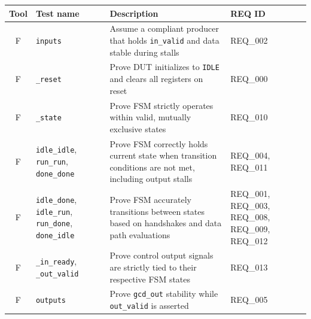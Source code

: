 \begin{table}[H]
    \centering
    \begin{tabularx}{\textwidth}{|c|p{3.9cm}|X|p{1.7cm}|}
        \toprule
        \textbf{Tool}   & \textbf{Test name}                                                                & \textbf{Description}                                                                                                      & \textbf{REQ ID}                                   \\ \midrule
        F               & \texttt{inputs}                                                                   & Assume a compliant producer that holds \texttt{in\_valid} and data stable during stalls                                   & REQ\_002                                          \\ \midrule
        F               & \texttt{\_reset}                                                                  & Prove DUT initializes to \texttt{IDLE} and clears all registers on reset                                                  & REQ\_000                                          \\ \midrule
        F               & \texttt{\_state}                                                                  & Prove FSM strictly operates within valid, mutually exclusive states                                                       & REQ\_010                                          \\ \midrule
        F               & \texttt{idle\_idle}, \texttt{run\_run}, \texttt{done\_done}                       & Prove FSM correctly holds current state when transition conditions are not met, including output stalls                   & REQ\_004, REQ\_011                                \\ \midrule
        F               & \texttt{idle\_done}, \texttt{idle\_run}, \texttt{run\_done}, \texttt{done\_idle}  & Prove FSM accurately transitions between states based on handshakes and data path evaluations                             & REQ\_001, REQ\_003, REQ\_008, REQ\_009, REQ\_012  \\ \midrule
        F               & \texttt{\_in\_ready}, \texttt{\_out\_valid}                                       & Prove control output signals are strictly tied to their respective FSM states                                             & REQ\_013                                          \\ \midrule
        F               & \texttt{outputs}                                                                  & Prove \texttt{gcd\_out} stability while \texttt{out\_valid} is asserted                                                   & REQ\_005                                          \\ \bottomrule \toprule

\end{tabularx}
\end{table}
